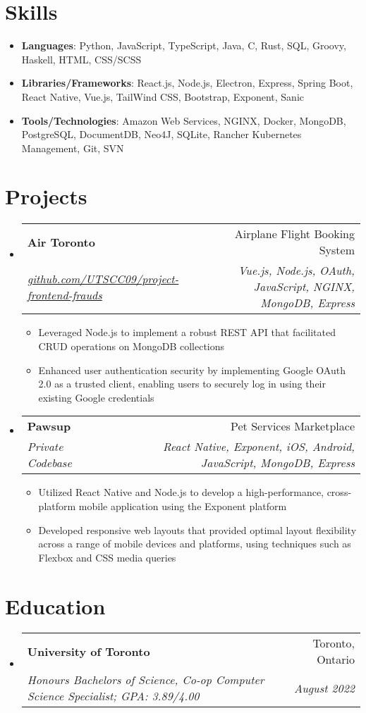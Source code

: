 \documentclass[letterpaper,10pt]{article}
\makeatletter
\newcommand{\resumeItem}[2]{
  \item\small{
    \textbf{#1}{: #2 \vspace{0pt}}
  }
}
\newcommand{\resumeSubheading}[4]{
  \vspace{-1pt}\item
    \begin{tabular*}{0.97\textwidth}{l@{\extracolsep{\fill}}r}
      \textbf{#1} & #2 \\
      \textit{\small#3} & \textit{\small #4} \\
    \end{tabular*}\vspace{-2pt}
}
\newcommand{\resumeSubItem}[2]{\resumeItem{#1}{#2}\vspace{-2pt}}
\newcommand{\resumeSubHeadingListStart}{\begin{itemize}[leftmargin=*]}
\newcommand{\resumeSubHeadingListEnd}{\end{itemize}}
\newcommand{\resumeItemListStart}{\begin{itemize}}
\newcommand{\resumeItemListEnd}{\end{itemize}\vspace{-3pt}}
\makeatother
\begin{document}
\section{Skills}
 \resumeSubHeadingListStart
 	\resumeSubItem{Languages}{Python, JavaScript, TypeScript, Java, C, Rust, SQL, Groovy, Haskell, HTML, CSS/SCSS}
 	\resumeSubItem{Libraries/Frameworks}{React.js, Node.js, Electron, Express, Spring Boot, React Native, Vue.js, TailWind CSS, Bootstrap, Exponent, Sanic}
 	\resumeSubItem{Tools/Technologies}{Amazon Web Services, NGINX, Docker, MongoDB, PostgreSQL, DocumentDB, Neo4J, SQLite, Rancher Kubernetes Management, Git, SVN}
 \resumeSubHeadingListEnd

\section{Projects}
   \resumeSubHeadingListStart
   \resumeSubheading
      {Air Toronto}{Airplane Flight Booking System}
      {\footnotesize{\href{https://github.com/UTSCC09/project-frontend-frauds}{github.com/UTSCC09/project-frontend-frauds}}}{\small{Vue.js, Node.js, OAuth, JavaScript, NGINX, MongoDB, Express}}
      \resumeItemListStart
       \item{ \small{ Leveraged Node.js to implement a robust REST API that facilitated CRUD operations on MongoDB collections }}
       \item{ \small{ Enhanced user authentication security by implementing Google OAuth 2.0 as a trusted client, enabling users to securely log in using their existing Google credentials }}
       \resumeItemListEnd
   \resumeSubheading
      {Pawsup}{Pet Services Marketplace}
      {\footnotesize{Private Codebase}}{\small{React Native, Exponent, iOS, Android, JavaScript, MongoDB, Express }}
      \resumeItemListStart
       \item{ \small{ Utilized React Native and Node.js to develop a high-performance, cross-platform mobile application using the Exponent platform }}
       \item{ \small{ Developed responsive web layouts that provided optimal layout flexibility across a range of mobile devices and platforms, using techniques such as Flexbox and CSS media queries }}
       \resumeItemListEnd 
  \resumeSubHeadingListEnd


\section{Education}
  \resumeSubHeadingListStart
    \resumeSubheading
      {University of Toronto}{Toronto, Ontario}
      {Honours Bachelors of Science, Co-op Computer Science Specialist;  GPA: 3.89/4.00}{August 2022}
 \resumeSubHeadingListEnd
 
\end{document}
